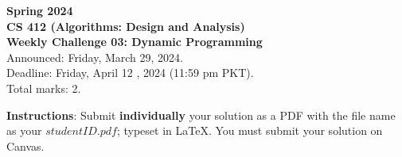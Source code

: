 \documentclass[a4paper]{exam}
\begin{document}
\begin{center}
{\Large \textbf{Spring 2024}}\vspace{1.0em}\\
{\Large \textbf{CS 412 (Algorithms: Design and Analysis)}}\vspace{1.0em}\\
{\Large \textbf{Weekly Challenge 03: Dynamic Programming}}\vspace{1.0em}\\
{\Large Announced: Friday, March 29, 2024.}\\
\vspace{.25em}
{\Large Deadline: Friday, April 12 , 2024 (11:59 pm PKT).}\\ 
\vspace{.3em}
{\Large Total marks: 2.}
\vspace{.5em}\\
\end{center}
\textbf{Instructions}: Submit \textbf{individually} your solution as a PDF with the file name as your $studentID.pdf$; typeset in LaTeX. You must submit your solution on Canvas.
\end{document}
